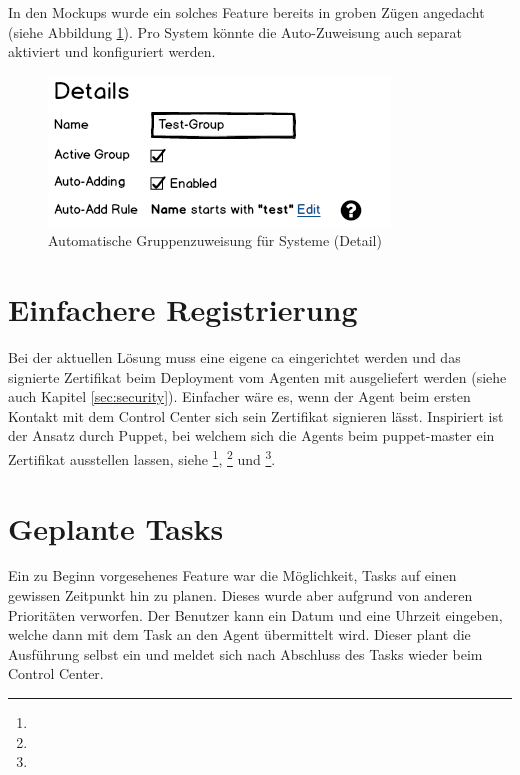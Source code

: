 In den Mockups wurde ein solches Feature bereits in groben Zügen angedacht (siehe Abbildung \ref{fig:ergebnis:group_systems_detail}). Pro System könnte die Auto-Zuweisung auch separat aktiviert und konfiguriert werden.

\begin{figure}
    \centering
    \includegraphics{files/mockups/group_systems_detail}
    \caption{Automatische Gruppenzuweisung für Systeme (Detail)}
    \label{fig:ergebnis:group_systems_detail}
\end{figure}

\section{Einfachere Registrierung} \label{sec:ausblick:simple_registration}

Bei der aktuellen Lösung muss eine eigene \gls{ca} eingerichtet werden und das signierte Zertifikat beim Deployment vom Agenten mit ausgeliefert werden (siehe auch Kapitel \ref{sec:security}). Einfacher wäre es, wenn der Agent beim ersten Kontakt mit dem Control Center sich sein Zertifikat signieren lässt. Inspiriert ist der Ansatz durch Puppet, bei welchem sich die Agents beim puppet-master ein Zertifikat ausstellen lassen, siehe \footnote{}, \footnote{} und \footnote{}.

\section{Geplante Tasks} \label{sec:ausblick:scheduled_tasks}

Ein zu Beginn vorgesehenes Feature war die Möglichkeit, Tasks auf einen gewissen Zeitpunkt hin zu planen. Dieses wurde aber aufgrund von anderen Prioritäten verworfen. Der Benutzer kann ein Datum und eine Uhrzeit eingeben, welche dann mit dem Task an den Agent übermittelt wird. Dieser plant die Ausführung selbst ein und meldet sich nach Abschluss des Tasks wieder beim Control Center.

